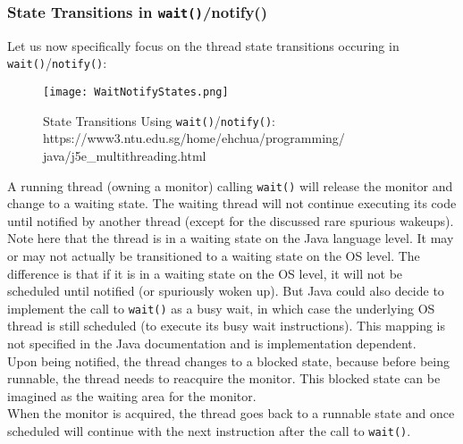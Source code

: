 \documentclass[main.tex]{subfiles}
\begin{document}
\subsubsection{State Transitions in \texttt{wait()}/notify()}
Let us now specifically focus on the thread state transitions occuring in \texttt{wait()}/\texttt{notify()}:
\begin{figure}[H]
    \centering
    \texttt{[image: WaitNotifyStates.png]}
    \caption{State Transitions Using \texttt{wait()}/\texttt{notify()}: https://www3.ntu.edu.sg/home/ehchua/programming/\\java/j5e\_multithreading.html}
\end{figure}
A running thread (owning a monitor) calling \texttt{wait()} will release the monitor and change to a waiting state. The waiting thread will not continue executing its code until notified by another thread (except for the discussed rare spurious wakeups). Note here that the thread is in a waiting state on the Java language level. It may or may not actually be transitioned to a waiting state on the OS level. The difference is that if it is in a waiting state on the OS level, it will not be scheduled until notified (or spuriously woken up). But Java could also decide to implement the call to \texttt{wait()} as a busy wait, in which case the underlying OS thread is still scheduled (to execute its busy wait instructions). This mapping is not specified in the Java documentation and is implementation dependent.\\
Upon being notified, the thread changes to a blocked state, because before being runnable, the thread needs to reacquire the monitor. This blocked state can be imagined as the waiting area for the monitor.\\
When the monitor is acquired, the thread goes back to a runnable state and once scheduled will continue with the next instruction after the call to \texttt{wait()}.
\end{document}
